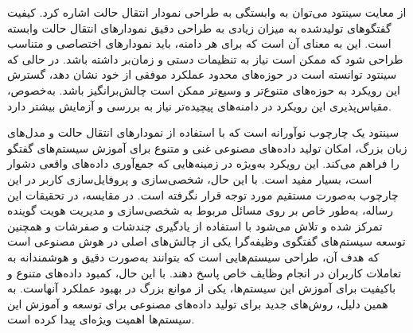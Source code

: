 \begin{enumerate}
از معایت سینتود می‌توان به وابستگی به طراحی نمودار انتقال حالت اشاره کرد. کیفیت گفتگوهای تولیدشده به میزان زیادی به طراحی دقیق نمودارهای انتقال حالت وابسته است. این به معنای آن است که برای هر دامنه، باید نمودارهای اختصاصی و متناسب طراحی شود که ممکن است نیاز به تنظیمات دستی و زمان‌بر داشته باشد.
\newline
در حالی که سینتود توانسته است در حوزه‌های محدود عملکرد موفقی از خود نشان دهد، گسترش این رویکرد به حوزه‌های متنوع‌تر و وسیع‌تر ممکن است چالش‌برانگیز باشد. به‌خصوص، مقیاس‌پذیری این رویکرد در دامنه‌های پیچیده‌تر نیاز به بررسی و آزمایش بیشتر دارد.


سینتود یک چارچوب نوآورانه است که با استفاده از نمودارهای انتقال حالت و مدل‌های زبان بزرگ، امکان تولید داده‌های مصنوعی غنی و متنوع برای آموزش سیستم‌های گفتگو را فراهم می‌کند. این رویکرد به‌ویژه در زمینه‌هایی که جمع‌آوری داده‌های واقعی دشوار است، بسیار مفید است. با این حال، شخصی‌سازی و پروفایل‌سازی کاربر در این چارچوب به‌صورت مستقیم مورد توجه قرار نگرفته است. در مقایسه، در تحقیقات این رساله، به‌طور خاص بر روی مسائل مربوط به شخصی‌سازی و مدیریت هویت گوینده تمرکز شده و تلاش می‌شود با استفاده از یادگیری چند‌شات و صفر‌شات و همچنین توسعه سیستم‌های گفتگوی وظیفه‌گرا یکی از چالش‌های اصلی در هوش مصنوعی است که هدف آن، طراحی سیستم‌هایی است که بتوانند به‌صورت دقیق و هوشمندانه به تعاملات کاربران در انجام وظایف خاص پاسخ دهند. با این حال، کمبود داده‌های متنوع و باکیفیت برای آموزش این سیستم‌ها، یکی از موانع بزرگ در بهبود عملکرد آنهاست. به همین دلیل، روش‌های جدید برای تولید داده‌های مصنوعی برای توسعه و آموزش این سیستم‌ها اهمیت ویژه‌ای پیدا کرده است.\\



\end{enumerate}
